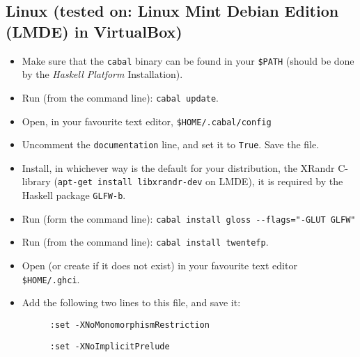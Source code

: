 \documentclass[]{article}
\begin{document}
\subsection{Linux (tested on: Linux Mint Debian Edition (LMDE) in VirtualBox)}
\begin{itemize}
  \item Make sure that the \texttt{cabal} binary can be found in your \texttt{\$PATH} (should be done by the \emph{Haskell Platform} Installation).
  \item Run (from the command line): \texttt{cabal update}.
  \item Open, in your favourite text editor, \texttt{\$HOME/.cabal/config}
  \item Uncomment the \texttt{documentation} line, and set it to \texttt{True}. Save the file.
  \item Install, in whichever way is the default for your distribution, the XRandr C-library (\texttt{apt-get install libxrandr-dev} on LMDE), it is required by the Haskell package \texttt{GLFW-b}.
  \item Run (form the command line): \texttt{cabal install gloss -{}-flags="-GLUT GLFW"}
  \item Run (from the command line): \texttt{cabal install twentefp}.
  \item Open (or create if it does not exist) in your favourite text editor \texttt{\$HOME/.ghci}.
  \item Add the following two lines to this file, and save it:
  \begin{description}
    \item[] \texttt{:set -XNoMonomorphismRestriction}
    \item[] \texttt{:set -XNoImplicitPrelude}
  \end{description}
\end{itemize}
\end{document}
